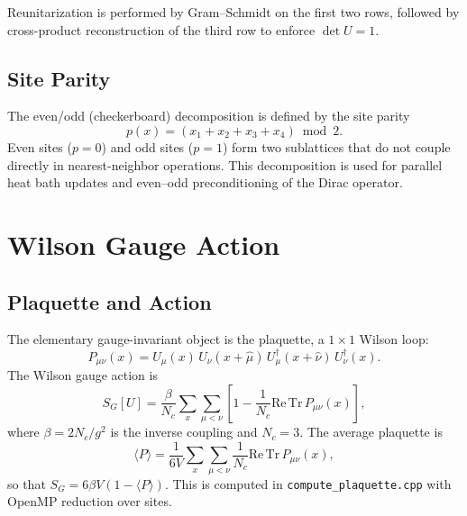 \documentclass[12pt]{article}
\newcommand{\ReTr}{\mathrm{Re\,Tr}}
\newcommand{\code}[1]{\texttt{#1}}
\begin{document}
Reunitarization is performed by Gram--Schmidt on the first two rows, followed by cross-product reconstruction of the third row to enforce $\det U = 1$.

\subsection{Site Parity}

The even/odd (checkerboard) decomposition is defined by the site parity
\begin{equation}
p(x) = (x_1 + x_2 + x_3 + x_4) \bmod 2.
\end{equation}
Even sites ($p = 0$) and odd sites ($p = 1$) form two sublattices that do not couple directly in nearest-neighbor operations. This decomposition is used for parallel heat bath updates and even--odd preconditioning of the Dirac operator.


\section{Wilson Gauge Action}
\label{sec:gauge_action}

\subsection{Plaquette and Action}

The elementary gauge-invariant object is the plaquette, a $1\times 1$ Wilson loop:
\begin{equation}
\label{eq:plaquette}
P_{\mu\nu}(x) = U_\mu(x) \, U_\nu(x + \hat{\mu}) \, U_\mu^\dagger(x + \hat{\nu}) \, U_\nu^\dagger(x).
\end{equation}
The Wilson gauge action is
\begin{equation}
\label{eq:wilson_action}
S_G[U] = \frac{\beta}{N_c} \sum_{x} \sum_{\mu < \nu} \left[ 1 - \frac{1}{N_c} \ReTr \, P_{\mu\nu}(x) \right],
\end{equation}
where $\beta = 2N_c / g^2$ is the inverse coupling and $N_c = 3$. The average plaquette is
\begin{equation}
\label{eq:avg_plaq}
\langle P \rangle = \frac{1}{6V} \sum_{x} \sum_{\mu < \nu} \frac{1}{N_c} \ReTr \, P_{\mu\nu}(x),
\end{equation}
so that $S_G = 6 \beta V (1 - \langle P \rangle)$. This is computed in \code{compute\_plaquette.cpp} with OpenMP reduction over sites.
\end{document}
